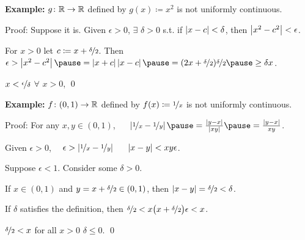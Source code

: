 \documentclass[10pt,aspectratio=169]{beamer}
\begin{document}
\begin{frame}

\textbf{Example:}
$g \colon {\mathbb{R}} \to {\mathbb{R}}$ defined by $g(x) \coloneqq x^2$ is not uniformly
continuous.

\pause
\medskip

Proof: Suppose it is.
\pause
Given $\epsilon > 0$,
$\exists$ $\delta > 0$ s.t.
if $\left\lvert {x-c} \right\rvert < \delta$, then $\left\lvert {x^2 -c^2} \right\rvert < \epsilon$.

\pause
For $x > 0$ let $c \coloneqq x+\nicefrac{\delta}{2}$.
\pause
Then
$\epsilon >
\abs{x^2-c^2}
\pause
= \abs{x+c}\abs{x-c}
\pause
=
(2x+\nicefrac{\delta}{2})\nicefrac{\delta}{2} 
\pause
\geq 
\delta x$.

\pause
\thus \quad $x < \nicefrac{\epsilon}{\delta}$ $\forall$ $x > 0$,
\pause
\quad
\contradiction
\qed

\pause
\medskip

\textbf{Example:}
$f \colon (0,1) \to {\mathbb{R}}$ defined by $f(x) \coloneqq \nicefrac{1}{x}$ is not
uniformly continuous.

\pause
\medskip

Proof:
For any $x,y \in (0,1)$, ~~
$\abs{\nicefrac{1}{x}-\nicefrac{1}{y}}
\pause
=
\frac{\abs{y-x}}{\abs{xy}} 
\pause
=
\frac{\abs{y-x}}{xy}$.

\pause
\medskip

Given $\epsilon > 0$,~~
$\epsilon >
\left\lvert {\nicefrac{1}{x}-\nicefrac{1}{y}} \right\rvert$ ~\iffif~
$\left\lvert {x-y} \right\rvert < xy \epsilon$.

\pause
Suppose $\epsilon < 1$.  Consider some $\delta > 0$.

\pause
If $x \in (0,1)$ and 
$y = x+\nicefrac{\delta}{2} \in (0,1)$,
then $\left\lvert {x-y} \right\rvert = \nicefrac{\delta}{2} < \delta$.

\pause
If $\delta$ satisfies the definition, then $\nicefrac{\delta}{2} < x \bigl( x+\nicefrac{\delta}{2} \bigr) \epsilon < x$.

\pause
\medskip

$\nicefrac{\delta}{2} < x$ for all $x > 0$
\wthus
$\delta \leq 0$.
\pause
\quad
\contradiction
\qed
\end{frame}
\end{document}
